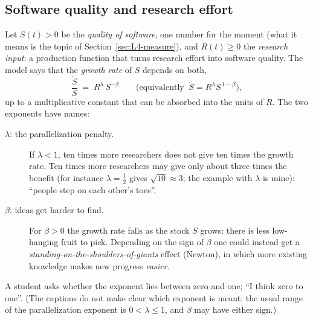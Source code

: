 \subsection{Software quality and research effort}\label{sec:L4-setup}
Let $S(t)>0$ be the \emph{quality of software}, one number for the moment (what it means is the topic of Section~\ref{sec:L4-measure}), and $R(t)\ge0$ the \emph{research input}: a production function that turns research effort into software quality. The model says that the \emph{growth rate} of $S$ depends on both,
\begin{equation}\label{eq:L4-jones}
   \frac{\dot S}{S}\;=\;R^{\lambda}\,S^{-\beta}
   \qquad\Big(\text{equivalently }\ \dot S=R^{\lambda}S^{\,1-\beta}\Big),
\end{equation}
up to a multiplicative constant that can be absorbed into the units of $R$. The two exponents have names:
\begin{description}
  \item[$\lambda$: the parallelization penalty.] If $\lambda<1$, ten times more researchers does not give ten times the growth rate. Ten times more researchers may give only about three times the benefit (for instance $\lambda=\tfrac12$ gives $\sqrt{10}\approx3$; the example with $\lambda$ is mine): ``people step on each other's toes''.
  \item[$\beta$: ideas get harder to find.] For $\beta>0$ the growth rate falls as the stock $S$ grows: there is less low-hanging fruit to pick. Depending on the sign of $\beta$ one could instead get a \emph{standing-on-the-shoulders-of-giants} effect (Newton), in which more existing knowledge makes new progress \emph{easier}.
\end{description}
A student asks whether the exponent lies between zero and one; ``I think zero to one''. (The captions do not make clear which exponent is meant\flag; the usual range of the parallelization exponent is $0<\lambda\le1$, and $\beta$ may have either sign.)

